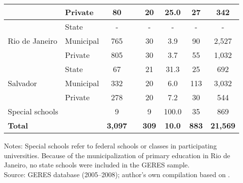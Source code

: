 \documentclass[a4paper, 12pt]{article}
\begin{document}
\begin{table}[H]
\begin{adjustbox}{width=1\textwidth}
\begin{tabular}{llllllll}
          & Private & \multicolumn{1}{c}{80 } &       & \multicolumn{1}{c}{20 } & \multicolumn{1}{c}{25.0} & \multicolumn{1}{c}{27 } & \multicolumn{1}{c}{342 } \\
    \midrule
          & State & \multicolumn{1}{c}{-} &       & \multicolumn{1}{c}{-} & \multicolumn{1}{c}{-} & \multicolumn{1}{c}{-} & \multicolumn{1}{c}{-} \\
    Rio de Janeiro & Municipal & \multicolumn{1}{c}{765 } &       & \multicolumn{1}{c}{30 } & \multicolumn{1}{c}{3.9} & \multicolumn{1}{c}{90 } & \multicolumn{1}{c}{2,527 } \\
          & Private & \multicolumn{1}{c}{805 } &       & \multicolumn{1}{c}{30 } & \multicolumn{1}{c}{3.7} & \multicolumn{1}{c}{55 } & \multicolumn{1}{c}{1,032 } \\
    \midrule
          & State & \multicolumn{1}{c}{67 } &       & \multicolumn{1}{c}{21 } & \multicolumn{1}{c}{31.3} & \multicolumn{1}{c}{25 } & \multicolumn{1}{c}{692 } \\
    Salvador & Municipal & \multicolumn{1}{c}{332 } &       & \multicolumn{1}{c}{20 } & \multicolumn{1}{c}{6.0} & \multicolumn{1}{c}{113 } & \multicolumn{1}{c}{3,032 } \\
          & Private & \multicolumn{1}{c}{278} &       & \multicolumn{1}{c}{20 } & \multicolumn{1}{c}{7.2} & \multicolumn{1}{c}{30 } & \multicolumn{1}{c}{544 } \\
    \midrule
    \multicolumn{2}{p{12.5em}}{Special schools} & \multicolumn{1}{c}{9 } &       & \multicolumn{1}{c}{9 } & \multicolumn{1}{c}{100.0} & \multicolumn{1}{c}{35 } & \multicolumn{1}{c}{869 } \\
    \midrule
    \textbf{Total} &       & \multicolumn{1}{c}{\textbf{3,097}} &       & \multicolumn{1}{c}{\textbf{309}} & \multicolumn{1}{c}{\textbf{10.0}} & \multicolumn{1}{c}{\textbf{883}} & \multicolumn{1}{c}{\textbf{21,569}} \\
    \bottomrule
   \end{tabular}%
  \end{adjustbox}
\end{table}%

\vspace{-13pt} \hspace{-20pt}
    \begin{minipage}{1\textwidth} 
{\scriptsize
Notes: Special schools refer to federal schools or classes in participating universities. Because of the municipalization of primary education in Rio de Janeiro, no state schools were included in the GERES sample. \\ Source: GERES database (2005–2008); author’s own compilation based on \citet{brooke2011geres}.\par}
\end{minipage}
\vspace{5pt}  
\end{document}

